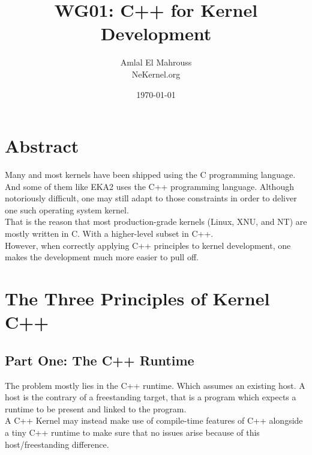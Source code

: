 \documentclass{article}
\title{WG01: C++ for Kernel Development}
\author{Amlal El Mahrouss\\NeKernel.org}
\date{\today}
\begin{document}
\maketitle

\section{Abstract}
{
Many and most kernels have been shipped using the C programming language.\\
And some of them like EKA2 uses the C++ programming language. Although notoriously difficult, one may still adapt to those constraints in order to deliver one such operating system kernel. \\
That is the reason that most production-grade kernels (Linux, XNU, and NT) are mostly written in C. With a higher-level subset in C++. \\
However, when correctly applying C++ principles to kernel development, one makes the development much more easier to pull off.
}

\section{The Three Principles of Kernel C++}
\subsection{Part One: The C++ Runtime}
{
The problem mostly lies in the C++ runtime. Which assumes an existing host. A host is the contrary of a freestanding target, that is a program which expects a runtime to be present and linked to the program. \\
A C++ Kernel may instead make use of compile-time features of C++ alongside a tiny C++ runtime to make sure that no issues arise because of this host/freestanding difference.
}
\end{document}
